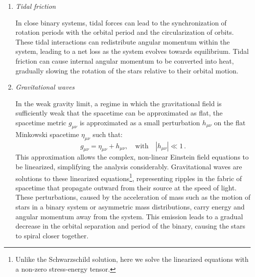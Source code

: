 \documentclass[main.tex]{subfiles}
\begin{document}
\begin{enumerate}
        \item \textit{Tidal friction}
        
        In close binary systems, tidal forces can lead to the synchronization of rotation periods with the orbital period and the circularization of orbits. These tidal interactions can redistribute angular momentum within the system, leading to a net loss as the system evolves towards equilibrium. Tidal friction can cause internal angular momentum to be converted into heat, gradually slowing the rotation of the stars relative to their orbital motion.

        \item \textit{Gravitational waves}

        In the weak gravity limit, a regime in which the gravitational field is sufficiently weak that the spacetime can be approximated as flat, the spacetime metric $g_{\mu \nu}$ is approximated as a small perturbation $h_{\mu \nu}$ on the flat Minkowski spacetime $\eta_{\mu \nu}$ such that:
        \begin{equation}\label{eq:weak_gravity_limit}
            g_{\mu \nu} = \eta_{\mu \nu} + h_{\mu \nu},\quad \text{with}\quad |h_{\mu \nu}| \ll 1\,.
        \end{equation}
        This approximation allows the complex, non-linear Einstein field equations to be linearized, simplifying the analysis considerably. Gravitational waves are solutions to these linearized equations\footnote{Unlike the Schwarzschild solution, here we solve the linearized equations with a non-zero stress-energy tensor.}, representing ripples in the fabric of spacetime that propagate outward from their source at the speed of light. These perturbations, caused by the acceleration of mass such as the motion of stars in a binary system or asymmetric mass distributions, carry energy and angular momentum away from the system. This emission leads to a gradual decrease in the orbital separation and period of the binary, causing the stars to spiral closer together.
    \end{enumerate}



    
\end{document}
